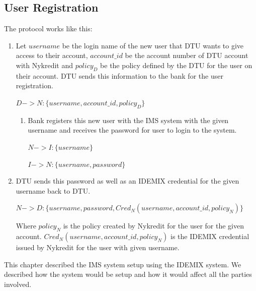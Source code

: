 \subsection{User Registration}
The protocol works like this:
\begin{enumerate} 
\item 	Let  $username$ be the login name of the new user that DTU wants to give access to their account, $account\_id$ be the account number of DTU account with Nykredit and $policy_D$ be the policy defined by the DTU for the user on their account. DTU sends this information to the bank for the user registration.

\begin{center}
	$D -> N : \{username,account\_id,policy_D\}$
\end{center}
\begin{enumerate}
	\item Bank registers this new user with the IMS system with the given username and receives the password for user to login to the system.
	\begin{center}
		$N -> I : \{username\}$
		
		$I -> N : \{username,password\}$
		
	\end{center}	
\end{enumerate}
\item DTU sends this password as well as an IDEMIX credential for the given username back to DTU.
	\begin{center}
		$N -> D : \{username,password,Cred_N(username,account\_id,policy_N)\}$
	\end{center}	
Where $policy_N$ is the policy created by Nykredit for the user for the given account. $Cred_N(username,account\_id,policy_N)$ is the IDEMIX credential issued by Nykredit for the user with given username.
\end{enumerate}

This chapter described the IMS system setup using the IDEMIX system. We described how the system would be setup and how it would affect all the parties involved.


